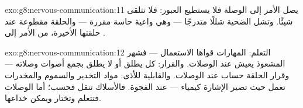 \begin{solution}{exo:g8:nervous-communication:11}
يصل الأمر إلى الوصلة فلا يستطيع العبور: فلا تتلقى
 شيئًا. وتشل الضحية شللًا متدرجًا --- وهي واعية
حاسة مقررة --- والحلقة مقطوعة عند حلقتها الأخيرة، من
الأمر إلى .
\end{solution}

\begin{solution}{exo:g8:nervous-communication:12}
التعلم: المهارات  قواها الاستعمال --- فشهر المشعوذ
يعيش عند الوصلات. والقرار: كل  يطلق أو لا يطلق بجمع
أصوات وصلاته --- وقرار الحلقة حساب عند الوصلات. والقابلية
للأذى: مواد التخدير والسموم والمخدرات تعمل حيث تصير
الإشارة كيمياء --- عند الفجوة. فالأسلاك تنقل فحسب؛ أما
الوصلات فتتعلم وتختار ويمكن خداعها.
\end{solution}

